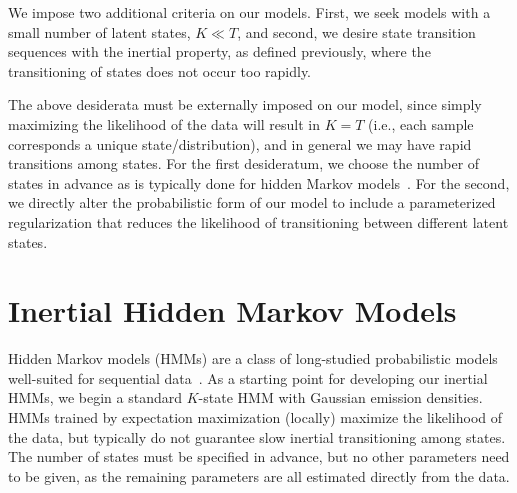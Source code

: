 \documentclass[letterpaper]{article}
\begin{document}
We impose two additional criteria on our models. First, we seek models
with a small number of latent states, $K \ll T$, and second, we desire state
transition sequences with the inertial property, as defined previously, where 
the transitioning of states does not occur too rapidly. 

The above desiderata must be externally imposed on our model, since simply
maximizing the likelihood of the data will result in $K = T$ (i.e., each sample
corresponds a unique state/distribution), and in general we may have rapid
transitions among states. For the first desideratum,  we choose the number of
states in advance as is typically done for hidden Markov
models~\cite{rabiner1989tutorial}. For the second, we directly alter the
probabilistic form of our model to include a parameterized regularization that
reduces the likelihood of transitioning between different latent states.

%
%
\section{Inertial Hidden Markov Models}

Hidden Markov models (HMMs) are a class of long-studied probabilistic models
well-suited for sequential data~\cite{rabiner1989tutorial}. As a starting point
for developing our inertial HMMs, we begin a standard $K$-state HMM with
Gaussian emission densities. HMMs trained by expectation maximization (locally) maximize the likelihood of the data,
but typically do not guarantee slow inertial transitioning among states. The
number of states must be specified in advance, but no other parameters need to
be given, as the remaining parameters are all estimated directly from the
data.
\end{document}
